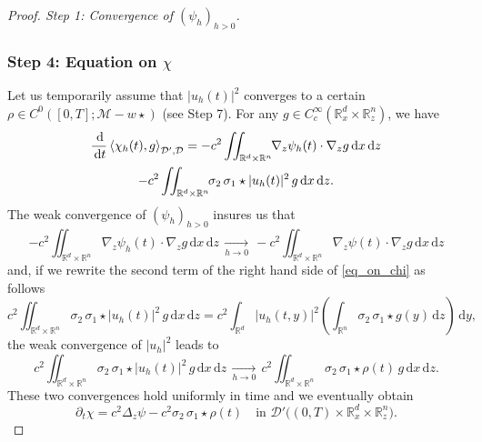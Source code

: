 \documentclass[JEP,XML,SOM,NoEqCountersInSection,NoFloatCountersInSection,Unicode,published]{cedram}
\theoremstyle{definition}
\newcommand{\R}{\mathbb{R}}
\newcommand{\ud}{\, {\mathrm{d}}}
\begin{document}
\begin{proof}[Proof. Step 1: Convergence of $(\psi_{h})_{h>0}$]
\subsubsection*{Step 4: Equation on $\chi$} Let us temporarily assume that
$|u_{h}(t)|^{2}$ converges to a certain $\rho\in C^{0}([0,T];\mathcal{M}-w\star)$ (see Step 7).
For any $g\in C_{c}^{\infty}(\R_{x}^{d}\times\R_{z}^{n})$, we have
\begin{multline}\label{eq_on_chi}
\frac{\ud}{\ud t}\left\langle\chi_{h}(t),g\right\rangle_{\mathcal{D}',\mathcal{D}}=-c^{2}\iint_{\R^{d}\times\R^{n}}\hspace*{-1mm}\nabla_{z}\psi_{h}(t)\cdot\nabla_{z}g\ud x\ud z\\
-c^{2}\iint_{\R^{d}\times\R^{n}}\hspace*{-1mm}\sigma_{2}\,\sigma_{1}\star|u_{h}(t)|^{2}\,g\ud x\ud z.
\end{multline}
The weak convergence of $(\psi_{h})_{h>0}$ insures us that
\[
-c^{2}\iint_{\R^{d}\times\R^{n}}\nabla_{z}\psi_{h}(t)\cdot\nabla_{z}g\ud x\ud z\,\underset{h\to 0}{\to}\,-c^{2}\iint_{\R^{d}\times\R^{n}}\nabla_{z}\psi(t)\cdot\nabla_{z}g\ud x\ud z
\]
and, if we rewrite the second term of the right hand side of \eqref{eq_on_chi} as follows
\[
c^{2}\iint_{\R^{d}\times\R^{n}}\sigma_{2}\,\sigma_{1}\star|u_{h}(t)|^{2}\,g\ud x\ud z=c^{2}\int_{\R^{d}}|u_{h}(t,y)|^{2}\left(\int_{\R^{n}}\sigma_{2}\,\sigma_{1}\star g(y)\ud z\right)\ud y,
\]
the weak convergence of $|u_{h}|^{2}$ leads to
\[
c^{2}\iint_{\R^{d}\times\R^{n}}\sigma_{2}\,\sigma_{1}\star|u_{h}(t)|^{2}\,g\ud x\ud z\,\underset{h\to 0}{\to}\,c^{2}\iint_{\R^{d}\times\R^{n}}\sigma_{2}\,\sigma_{1}\star\rho(t)\,g\ud x\ud z.
\]
These two convergences hold uniformly in time and we eventually obtain
\[
\partial_{t}\chi=c^{2}\Delta_{z}\psi-c^{2}\sigma_{2}\,\sigma_{1}\star\rho(t)\quad\text{in }\mathcal{D}'\bigl((0,T)\times\R_{x}^{d}\times\R_{z}^{n}\bigr).
\]


\end{proof}
\end{document}
